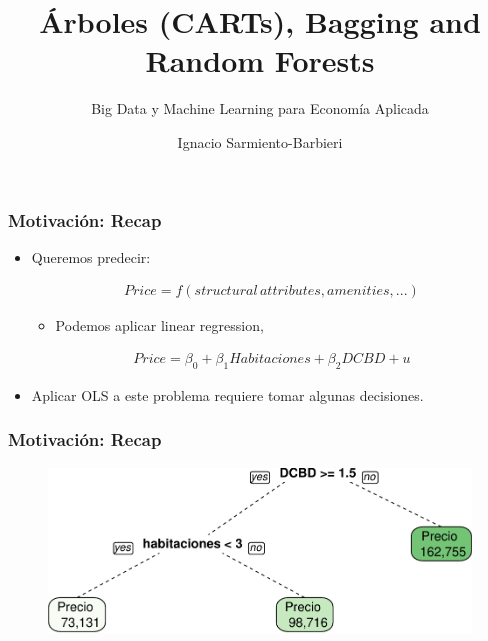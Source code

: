 \documentclass[
  shownotes,
  xcolor={svgnames},
  hyperref={colorlinks,citecolor=DarkBlue,linkcolor=andesred,urlcolor=DarkBlue}
  , aspectratio=169]{beamer}
\begin{document}
\title{Árboles (CARTs), Bagging and Random Forests}
\subtitle{Big Data y Machine Learning para Economía Aplicada}
\date{}

\author[Sarmiento-Barbieri]{Ignacio Sarmiento-Barbieri}


\begin{frame}[noframenumbering]
\maketitle
\end{frame}




\begin{frame}
\frametitle{Motivación: Recap}


\begin{itemize}
    \item Queremos predecir:

    \begin{align}
    Price=f(structural\,attributes,amenities,...)
    \end{align}
    \medskip
    \begin{itemize}
      \item Podemos aplicar linear regression,
    \end{itemize}
    \begin{align}
    Price=\beta_0 + \beta_1 Habitaciones + \beta_2 DCBD + u
    \end{align}
  \medskip

  \item Aplicar OLS a este problema requiere tomar algunas decisiones.
  \end{itemize}
\end{frame}
\begin{frame}[fragile]
\frametitle{Motivación: Recap}



\begin{figure}[H] \centering
            \captionsetup{justification=centering}
              \includegraphics[scale=0.4]{figures/trees.pdf}                           
 \end{figure}

\end{frame}
\end{document}

